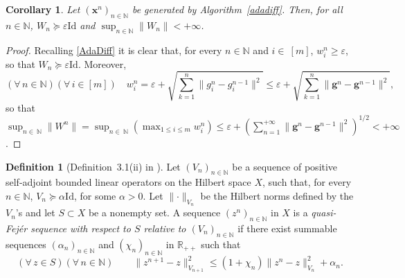 \documentclass[11pt]{article}
\theoremstyle{plain}
\newtheorem{corollary}[theorem]{Corollary}
\theoremstyle{definition}
\newtheorem{definition}[theorem]{Definition}
\theoremstyle{remark}
\newcommand{\norm}[1]{\lVert{#1}\rVert}
\newcommand{\abs}[1]{\lvert{#1}\rvert}
\newcommand{\HH}{X}
\newcommand{\R}{\mathbb{R}}
\newcommand{\x}{x}
\newcommand{\bx}{\bm{x}}
\newcommand{\buu}{\bm{g}}
\newcommand{\uu}{g}
\newcommand{\w}{w}
\newcommand{\iter}{n}
\newcommand{\ite}{k}
\newcommand{\N}{\mathbb{N}}
\newcommand{\Id}{\mathrm{Id}}
\newcommand{\W}{W}
\begin{document}
\begin{corollary}
\label{cor:20260126a}
Let $(\bx^\iter)_{\iter\in \N}$ be generated by Algorithm~\ref{adadiff}.
 Then,
for all $\iter\in \N$, $\W_\iter\succeq \varepsilon \Id$ and $\sup_{\iter\in \N}\norm{\W_\iter}<+\infty$.
\end{corollary}
\begin{proof}
Recalling \eqref{AdaDiff} it is clear that, for every $\iter\in \N$ and $i\in\ [m]$, $\w_i^\iter\geq \varepsilon$, so that
$\W_\iter \succeq \varepsilon \Id$. Moreover,
\begin{equation*}
(\forall\,\iter\in \N)(\forall\,i\in [m])\quad w^\iter_i = \varepsilon + \sqrt{\sum_{\ite=1}^\iter \norm{\uu_i^\iter- \uu_i^{\iter-1}}^2} \leq \varepsilon + \sqrt{\sum_{\ite=1}^\iter \norm{\buu^\iter- \buu^{\iter-1}}^2},
\end{equation*}
so that $\sup_{\iter\in\ \N}\norm{\W^\iter}=\sup_{\iter\in\ \N}(\max_{1\leq i\leq m} \w_i^\iter) \leq \varepsilon + (\sum_{\iter=1}^{+\infty} \norm{\buu^\iter- \buu^{\iter-1}}^2)^{1/2}<+\infty$.
\end{proof}

\begin{definition}[{Definition~3.1(ii) in \cite{combettes2013variable}}]
\label{def:fejer}
Let $(V_\iter)_{\iter\in \N}$ be a sequence of positive self-adjoint bounded linear operators on the Hilbert space $\HH$,
such that, for every $\iter\in \N$, $V_n \succeq \alpha \Id$, for some $\alpha>0$.
Let $\norm{\cdot}_{V_n}$ be the Hilbert norms defined by the $V_\iter$'s
and let $S \subset \HH$ be a nonempty set.
A sequence ${(z^\iter)}_{\iter \in \N}$ in $\HH$ is a 
\emph{quasi-Fej\'er  sequence with respect to $S$
relative to ${(V_\iter)}_{\iter \in \N}$}  if
there exist summable sequences ${(\alpha_\iter)}_{\iter \in \N}$
and ${(\chi_\iter)}_{\iter \in \N}$ in $\R_{++}$ such that
\begin{equation}
\label{eq:fejerprop}
(\forall\, z \in S)(\forall\, \iter \in \N)\qquad \norm{z^{\iter+1} - z}_{V_{\iter+1}}^2 
\leq (1+\chi_\iter) \norm{z^\iter - z}_{V_\iter}^2 + \alpha_\iter.
\end{equation}
\end{definition}
\end{document}
